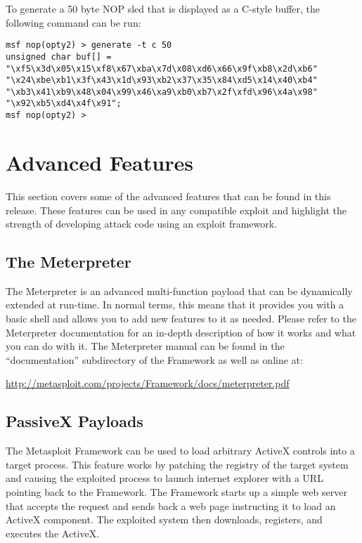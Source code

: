 \documentclass{report}
\begin{document}
\par
To generate a 50 byte NOP sled that is displayed as a C-style buffer, the
following command can be run:

\begin{verbatim}
msf nop(opty2) > generate -t c 50
unsigned char buf[] =
"\xf5\x3d\x05\x15\xf8\x67\xba\x7d\x08\xd6\x66\x9f\xb8\x2d\xb6"
"\x24\xbe\xb1\x3f\x43\x1d\x93\xb2\x37\x35\x84\xd5\x14\x40\xb4"
"\xb3\x41\xb9\x48\x04\x99\x46\xa9\xb0\xb7\x2f\xfd\x96\x4a\x98"
"\x92\xb5\xd4\x4f\x91";
msf nop(opty2) >   
\end{verbatim}

\pagebreak
\chapter{Advanced Features}

\par
This section covers some of the advanced features that can be found in this
release. These features can be used in any compatible exploit and highlight
the strength of developing attack code using an exploit framework. 

\section{The Meterpreter}
\par
The Meterpreter is an advanced multi-function payload that can be dynamically
extended at run-time. In normal terms, this means that it provides you with a
basic shell and allows you to add new features to it as needed. Please refer
to the Meterpreter documentation for an in-depth description of how it works
and what you can do with it. The Meterpreter manual can be found in the
``documentation'' subdirectory of the Framework as well as online at:

\url{http://metasploit.com/projects/Framework/docs/meterpreter.pdf}

\section{PassiveX Payloads}

\par The Metasploit Framework can be used to
load arbitrary ActiveX controls into a target process. This feature works by
patching the registry of the target system and causing the exploited process
to launch internet explorer with a URL pointing back to the Framework. The
Framework starts up a simple web server that accepts the request and sends
back a web page instructing it to load an ActiveX component. The exploited
system then downloads, registers, and executes the ActiveX. 
\end{document}
